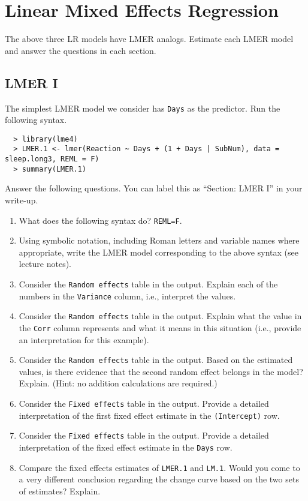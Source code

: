 \documentclass[]{article}
\begin{document}
%
%
\pagebreak
\section*{Linear Mixed Effects Regression}

\noindent The above three LR models have LMER analogs. Estimate each LMER model and answer the questions in each section.

\subsection*{LMER I}

\noindent The simplest LMER model we consider has \texttt{Days} as the predictor. Run the following syntax.

\begin{verbatim}
  > library(lme4)
  > LMER.1 <- lmer(Reaction ~ Days + (1 + Days | SubNum), data = sleep.long3, REML = F)
  > summary(LMER.1)
\end{verbatim}

\noindent Answer the following questions. You can label this as ``Section: LMER I'' in your write-up.

\begin{enumerate}[resume]
\item What does the following syntax do? \texttt{REML=F}.
\item Using symbolic notation, including Roman letters and variable names where appropriate, write the LMER model corresponding to the above syntax (see lecture notes).
\item Consider the \texttt{Random effects} table in the output. Explain each of the numbers in the \texttt{Variance} column, i.e., interpret the values.
\item Consider the \texttt{Random effects} table in the output. Explain what the value in the \texttt{Corr} column represents and what it means in this situation (i.e., provide an interpretation for this example).
\item Consider the \texttt{Random effects} table in the output. Based on the estimated values, is there evidence that the second random effect belongs in the model? Explain. (Hint: no addition calculations are required.)
\item Consider the \texttt{Fixed effects} table in the output. Provide a detailed interpretation of the first fixed effect estimate in the \texttt{(Intercept)} row.
\item Consider the \texttt{Fixed effects} table in the output. Provide a detailed interpretation of the fixed effect estimate in the \texttt{Days} row.
\item Compare the fixed effects estimates of \texttt{LMER.1} and \texttt{LM.1}. Would you come to a very different conclusion regarding the change curve based on the two sets of estimates? Explain.
\end{enumerate}
\end{document}
